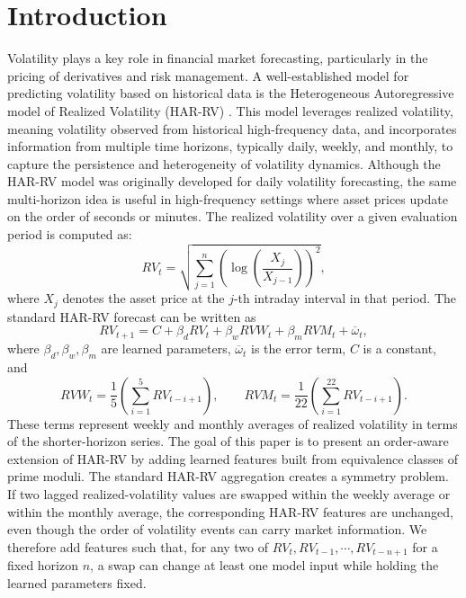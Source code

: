 ﻿\documentclass[11pt,a4paper]{article}
\begin{document}
\section{Introduction}
\vspace{0.3cm}
\noindent
Volatility plays a key role in financial market forecasting, particularly in the pricing of derivatives and risk management. A well-established model for predicting volatility based on historical data is the Heterogeneous Autoregressive model of Realized Volatility (HAR-RV) \cite{corsi2009}. This model leverages realized volatility, meaning volatility observed from historical high-frequency data, and incorporates information from multiple time horizons, typically daily, weekly, and monthly, to capture the persistence and heterogeneity of volatility dynamics. Although the HAR-RV model was originally developed for daily volatility forecasting, the same multi-horizon idea is useful in high-frequency settings where asset prices update on the order of seconds or minutes. The realized volatility over a given evaluation period is computed as:
\[
RV_t = \sqrt{\sum_{j=1}^n \left(\log\left(\frac{X_j}{X_{j-1}}\right)\right)^2},
\]
where $X_j$ denotes the asset price at the $j$-th intraday interval in that period.
\vspace{0.3cm}
\noindent The standard HAR-RV forecast can be written as
\[
RV_{t+1} = C + \beta_d RV_t + \beta_wRVW_t + \beta_m RVM_t + \overline{\omega}_t,
\]
where $\beta_d, \beta_w, \beta_m$ are learned parameters, $\overline{\omega}_t$ is the error term, $C$ is a constant, and
\[
RVW_t = \frac15\left(\sum_{i=1}^5 RV_{t-i+1}\right),
\qquad
RVM_t = \frac1{22}\left(\sum_{i=1}^{22} RV_{t-i+1}\right).
\]
These terms represent weekly and monthly averages of realized volatility in terms of the shorter-horizon series. The goal of this paper is to present an order-aware extension of HAR-RV by adding learned features built from equivalence classes of prime moduli.
\vspace{0.3cm}
\noindent The standard HAR-RV aggregation creates a symmetry problem. If two lagged realized-volatility values are swapped within the weekly average or within the monthly average, the corresponding HAR-RV features are unchanged, even though the order of volatility events can carry market information. We therefore add features such that, for any two of $RV_t, RV_{t-1}, \cdots, RV_{t-n+1}$ for a fixed horizon $n$, a swap can change at least one model input while holding the learned parameters fixed.
\end{document}
